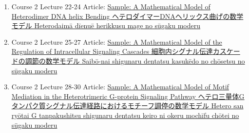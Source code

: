 \documentclass[preprint, 8pt]{elsarticle}
\theoremstyle{definition}
\begin{document}
\begin{CJK}{UTF8}{min}
\begin{enumerate}
\item Course 2 Lecture 22-24 Article: \href{}{Sample: A Mathematical Model of Heterodimer DNA helix Bending  ヘテロダイマーDNAヘリックス曲げの数学モデル Heterodaimā dīenuē herikkusu mage no sūgaku moderu}
\item Course 2 Lecture 25-27 Article: \href{}{Sample: A Mathematical Model of the Regulation of Intracellular Signaling Cascades 細胞内シグナル伝達カスケードの調節の数学モデル Saibō-nai shigunaru dentatsu kasukēdo no chōsetsu no sūgaku moderu}
\item Course 2 Lecture 28-30 Article: \href{}{Sample: A Mathematical Model of Motif Mediation in the Heterotrimeric G-protein Signaling Pathway ヘテロ三量体Gタンパク質シグナル伝達経路におけるモチーフ調停の数学モデル Hetero san ryōtai G tanpakushitsu shigunaru dentatsu keiro ni okeru mochīfu chōtei no sūgaku moderu}
\end{enumerate}


\end{CJK}
\end{document}
